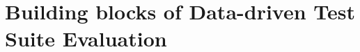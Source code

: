 
\section{Building blocks of Data-driven Test Suite Evaluation}
\label{sec:limitationsData}









\clearpage